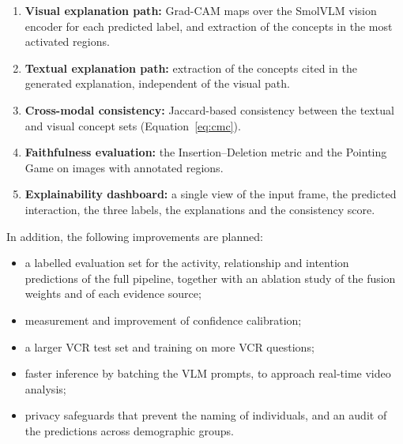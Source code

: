 \documentclass[12pt,a4paper,oneside]{report}
\begin{document}
\begin{enumerate}[leftmargin=*]
\item \textbf{Visual explanation path:} Grad-CAM maps over the SmolVLM vision
  encoder for each predicted label, and extraction of the concepts in the most
  activated regions.
\item \textbf{Textual explanation path:} extraction of the concepts cited in the
  generated explanation, independent of the visual path.
\item \textbf{Cross-modal consistency:} Jaccard-based consistency between the
  textual and visual concept sets (Equation~\ref{eq:cmc}).
\item \textbf{Faithfulness evaluation:} the Insertion--Deletion metric and the
  Pointing Game on images with annotated regions.
\item \textbf{Explainability dashboard:} a single view of the input frame, the
  predicted interaction, the three labels, the explanations and the consistency
  score.
\end{enumerate}

In addition, the following improvements are planned:

\begin{itemize}[leftmargin=*]
\item a labelled evaluation set for the activity, relationship and intention
  predictions of the full pipeline, together with an ablation study of the
  fusion weights and of each evidence source;
\item measurement and improvement of confidence calibration;
\item a larger VCR test set and training on more VCR questions;
\item faster inference by batching the VLM prompts, to approach real-time video
  analysis;
\item privacy safeguards that prevent the naming of individuals, and an audit of
  the predictions across demographic groups.
\end{itemize}
\end{document}

